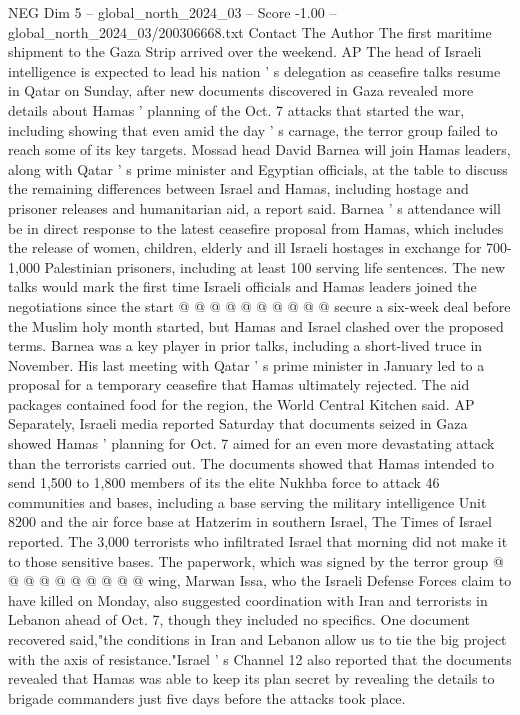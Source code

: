 \begin{textsample}{NEG Dim 5 – global\_north\_2024\_03 – Score -1.00 – global\_north\_2024\_03/200306668.txt}  \label{ex:f5_neg_085}
Contact The Author The first maritime shipment to the Gaza Strip arrived over the weekend.
AP The head of Israeli intelligence is expected to lead his nation ' s delegation as ceasefire talks resume in Qatar on Sunday, after new documents discovered in Gaza revealed more details about Hamas ' planning of the Oct. 7 attacks that started the war, including showing that even amid the day ' s carnage, the terror group failed to reach some of its key targets.
Mossad head David Barnea will join Hamas leaders, along with Qatar ' s prime minister and Egyptian officials, at the table to discuss the remaining differences between Israel and Hamas, including hostage and prisoner releases and humanitarian aid, a report said.
Barnea ' s attendance will be in direct response to the latest ceasefire proposal from Hamas, which includes the release of women, children, elderly and ill Israeli hostages in exchange for 700-1,000 Palestinian prisoners, including at least 100 serving life sentences.
The new talks would mark the first time Israeli officials and Hamas leaders joined the negotiations since the start @ @ @ @ @ @ @ @ @ @ secure a six-week deal before the Muslim holy month started, but Hamas and Israel clashed over the proposed terms.
Barnea was a key player in prior talks, including a short-lived truce in November.
His last meeting with Qatar ' s prime minister in January led to a proposal for a temporary ceasefire that Hamas ultimately rejected.
The aid packages contained food for the region, the World Central Kitchen said.
AP Separately, Israeli media reported Saturday that documents seized in Gaza showed Hamas ' planning for Oct. 7 aimed for an even more devastating attack than the terrorists carried out.
The documents showed that Hamas intended to send 1,500 to 1,800 members of its the elite Nukhba force to attack 46 communities and bases, including a base serving the military intelligence Unit 8200 and the air force base at Hatzerim in southern Israel, The Times of Israel reported.
The 3,000 terrorists who infiltrated Israel that morning did not make it to those sensitive bases.
The paperwork, which was signed by the terror group @ @ @ @ @ @ @ @ @ @ wing, Marwan Issa, who the Israeli Defense Forces claim to have killed on Monday, also suggested coordination with Iran and terrorists in Lebanon ahead of Oct. 7, though they included no specifics.
One document recovered said,"the conditions in Iran and Lebanon allow us to tie the big project with the axis of resistance."Israel ' s Channel 12 also reported that the documents revealed that Hamas was able to keep its plan secret by revealing the details to brigade commanders just five days before the attacks took place.

\end{textsample}
